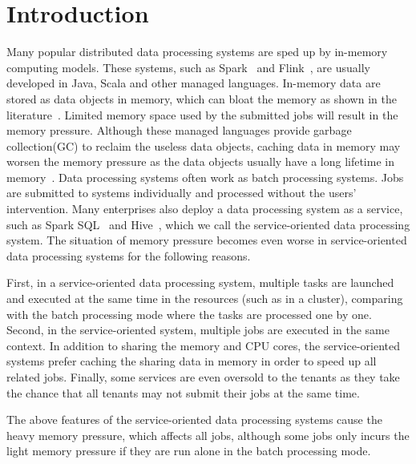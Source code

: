 \section{Introduction}

Many popular distributed data processing systems are sped up by in-memory computing models. These systems, such as Spark~\cite{zaharia2012resilient} and Flink~\cite{hueske2012opening}, are usually developed in Java, Scala and other managed languages. In-memory data are stored as data objects in memory, which can bloat the memory as shown in the literature~\cite{bu:bloat}. Limited memory space used by the submitted jobs will result in the memory pressure. Although these managed languages provide garbage collection(GC) to reclaim the useless data objects, caching data in memory may worsen the memory pressure as the data objects usually have a long lifetime in memory~\cite{lulu:deca}. 
Data processing systems often work as batch processing systems. Jobs are submitted to systems individually and processed without the users' intervention. Many enterprises also deploy a data processing system  as a service, such as Spark SQL~\cite{armbrust2015spark} and Hive~\cite{ashish:hive}, which we call the service-oriented data processing system. The situation of memory pressure becomes even worse in service-oriented data processing systems for the following reasons. 

First, in a service-oriented data processing system, multiple tasks are launched and executed at the same time in the resources (such as in a cluster), comparing with the batch processing mode where the tasks are processed one by one.
Second, in the service-oriented system, multiple jobs are executed in the same context. In addition to sharing the memory and CPU cores, the service-oriented systems prefer caching the sharing data in memory in order to speed up all related jobs.
Finally, some services are even oversold to the tenants as they take the chance that all tenants may not submit their jobs at the same time.  

The above features of the service-oriented data processing systems cause the heavy memory pressure, which affects all jobs, although some jobs only incurs the light memory pressure if they are run alone in the batch processing mode.


